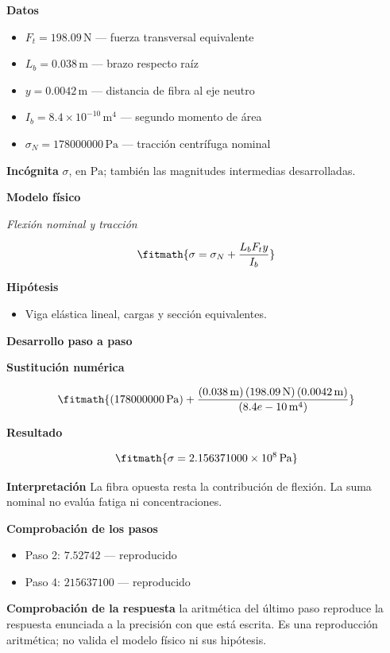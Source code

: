 \documentclass[10pt,openany]{book}
\begin{document}
\noindent\textbf{Datos}
\begin{itemize}
\item $F_t = 198.09\,\mathrm{N}$ — fuerza transversal equivalente
\item $L_b = 0.038\,\mathrm{m}$ — brazo respecto raíz
\item $y = 0.0042\,\mathrm{m}$ — distancia de fibra al eje neutro
\item $I_b = 8.4\times 10^{-10}\,\mathrm{m}^{4}$ — segundo momento de área
\item $\sigma_N = 178000000\,\mathrm{Pa}$ — tracción centrífuga nominal
\end{itemize}

\noindent\textbf{Incógnita}
$\sigma$, en $\mathrm{Pa}$; también las magnitudes intermedias desarrolladas.

\noindent\textbf{Modelo físico}

\noindent\textit{Flexión nominal y tracción}

\[
\fitmath{\sigma=\sigma_N + \frac{L_b F_t y}{I_b}}
\]

\noindent\textbf{Hipótesis}
\begin{itemize}
\item Viga elástica lineal, cargas y sección equivalentes.
\end{itemize}

\noindent\textbf{Desarrollo paso a paso}



\noindent\textbf{Sustitución numérica}

\[
\fitmath{\left(178000000\,\mathrm{Pa}\right) + \frac{\left(0.038\,\mathrm{m}\right) \left(198.09\,\mathrm{N}\right) \left(0.0042\,\mathrm{m}\right)}{\left(8.4e-10\,\mathrm{m}^{4}\right)}}
\]

\noindent\textbf{Resultado}

\[
\fitmath{\sigma=2.156371000\times10^{8}\,\mathrm{Pa}}
\]

\noindent\textbf{Interpretación}
La fibra opuesta resta la contribución de flexión. La suma nominal no evalúa fatiga ni concentraciones.

\noindent\textbf{Comprobación de los pasos}
\begin{itemize}
\item Paso 2: $7.52742$ — reproducido
\item Paso 4: $215637100$ — reproducido
\end{itemize}

\noindent\textbf{Comprobación de la respuesta} la aritmética del último paso reproduce la respuesta enunciada a la precisión con que está escrita. Es una reproducción aritmética; no valida el modelo físico ni sus hipótesis.
\end{document}
